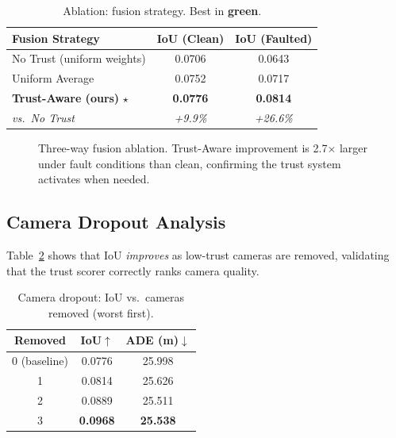 \documentclass[10pt,twocolumn]{article}
\newcommand{\best}[1]{\textbf{\color{mygreen}#1}}
\begin{document}
\begin{table}[h]
\centering
\caption{Ablation: fusion strategy. Best in \best{green}.}
\label{tab:fusion}
\scriptsize
\setlength{\tabcolsep}{5pt}
\begin{tabular}{@{}lcc@{}}
\toprule
\textbf{Fusion Strategy} & \textbf{IoU (Clean)} &
\textbf{IoU (Faulted)} \\
\midrule
No Trust (uniform weights) & 0.0706 & 0.0643 \\
Uniform Average & 0.0752 & 0.0717 \\
\rowcolor{mygray}
\textbf{Trust-Aware (ours)} $\star$ & \best{0.0776} & \best{0.0814} \\
\midrule
\textit{vs.\ No Trust} & \textit{+9.9\%} & \textit{+26.6\%} \\
\bottomrule
\end{tabular}
\end{table}

\begin{figure}[h]
\centering
{}
\caption{Three-way fusion ablation. Trust-Aware improvement is
2.7$\times$ larger under fault conditions than clean, confirming
the trust system activates when needed.}
\label{fig:ablation}
\end{figure}

\subsection{Camera Dropout Analysis}

Table~\ref{tab:dropout} shows that IoU \textit{improves} as
low-trust cameras are removed, validating that the trust scorer
correctly ranks camera quality.

\begin{table}[h]
\centering
\caption{Camera dropout: IoU vs.\ cameras removed (worst first).}
\label{tab:dropout}
\scriptsize
\setlength{\tabcolsep}{6pt}
\begin{tabular}{@{}ccc@{}}
\toprule
\textbf{Removed} & \textbf{IoU$\uparrow$} & \textbf{ADE (m)$\downarrow$} \\
\midrule
0 (baseline) & 0.0776 & 25.998 \\
1 & 0.0814 & 25.626 \\
2 & 0.0889 & 25.511 \\
3 & \best{0.0968} & \best{25.538} \\
\bottomrule
\end{tabular}
\end{table}
\end{document}
